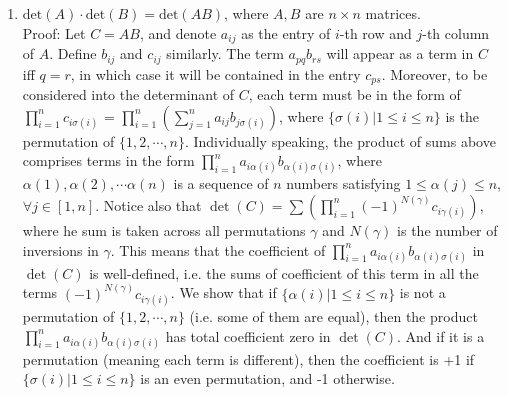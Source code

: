 \documentclass[11pt,a4paper]{article}
\begin{document}
\begin {enumerate}
\item $\text{det}(A)\cdot\text{det}(B)=\text{det}(AB)$, where $A, B$ are $n\times n$ matrices.\\
Proof: Let $C=AB$, and denote $a_{ij}$ as the entry of $i$-th row and $j$-th column of $A$. Define $b_{ij}$ and $c_{ij}$ similarly. The term $a_{pq}b_{rs}$ will appear as a term in $C$ iff $q=r$, in which case it will be contained in the entry $c_{ps}$. Moreover, to be considered into the determinant of $C$, each term must be in the form of 
$\displaystyle\prod_{i=1}^{n}c_{i\sigma (i)}$
=
$\displaystyle\prod_{i=1}^{n}\left(\displaystyle\sum_{j=1}^{n}a_{ij}b_{j\sigma(i)}\right)$,
where $\{\sigma (i)|1\le i\le n\}$ is the permutation of $\{1, 2, \cdots , n\}$.
Individually speaking, the product of sums above comprises terms in the form $\displaystyle\prod_{i=1}^{n}a_{i\alpha (i)}b_{\alpha (i)\sigma (i)}$, where $\alpha (1), \alpha (2), \cdots \alpha (n)$ is a sequence of $n$ numbers satisfying $1\le\alpha(j)\le n$, $\forall j\in[1,n]$. Notice also that $\det (C)=\displaystyle\sum\left(\displaystyle\prod_{i=1}^{n} (-1)^{N(\gamma)}c_{i\gamma (i)}\right)$, where he sum is taken across all permutations $\gamma$ and $N(\gamma)$ is the number of inversions in $\gamma$. This means that the coefficient of $\displaystyle\prod_{i=1}^{n}a_{i\alpha (i)}b_{\alpha (i)\sigma (i)}$ in $\det (C)$ is well-defined, i.e. the sums of coefficient of this term in all the terms $(-1)^{N(\gamma)}c_{i\gamma (i)}$. We show that if $\{\alpha (i)|1\le i\le n\}$ is not a permutation of $\{1, 2, \cdots , n\}$ (i.e. some of them are equal), then the product $\displaystyle\prod_{i=1}^{n}a_{i\alpha (i)}b_{\alpha (i)\sigma (i)}$ has total coefficient zero in $\det (C)$. And if it is a permutation (meaning each term is different), then the coefficient is +1 if $\{\sigma (i)|1\le i\le n\}$ is an even permutation, and -1 otherwise.


\end{enumerate}
\end{document}
